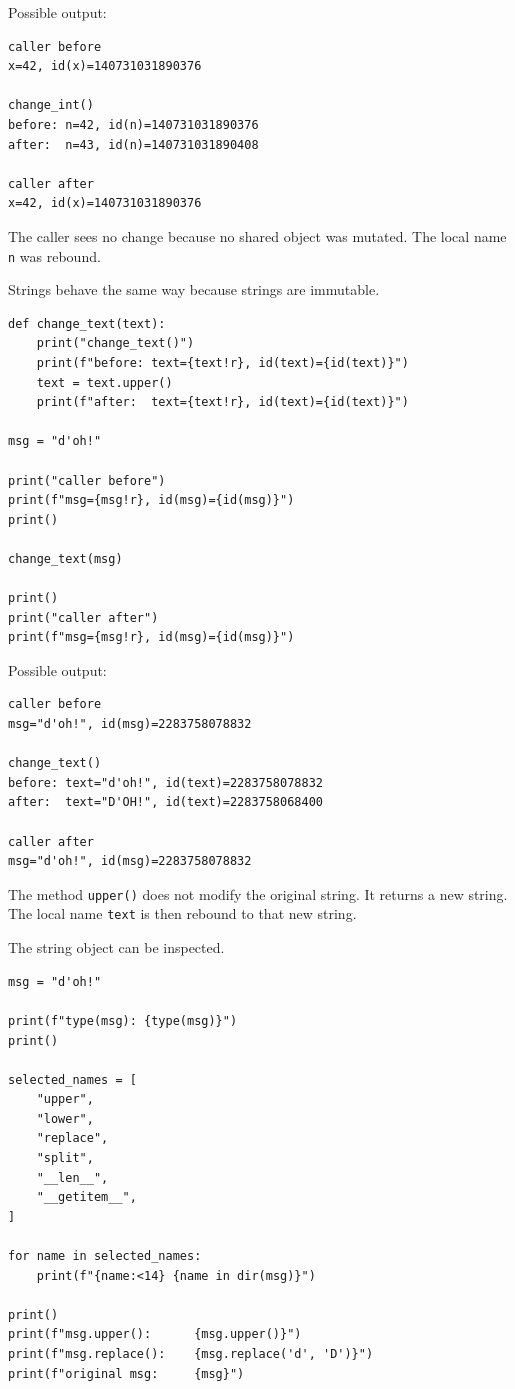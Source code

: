 Possible output:

\begin{verbatim}
caller before
x=42, id(x)=140731031890376

change_int()
before: n=42, id(n)=140731031890376
after:  n=43, id(n)=140731031890408

caller after
x=42, id(x)=140731031890376
\end{verbatim}

The caller sees no change because no shared object was mutated. The local name \texttt{n} was rebound.

Strings behave the same way because strings are immutable.

\begin{verbatim}
def change_text(text):
    print("change_text()")
    print(f"before: text={text!r}, id(text)={id(text)}")
    text = text.upper()
    print(f"after:  text={text!r}, id(text)={id(text)}")

msg = "d'oh!"

print("caller before")
print(f"msg={msg!r}, id(msg)={id(msg)}")
print()

change_text(msg)

print()
print("caller after")
print(f"msg={msg!r}, id(msg)={id(msg)}")
\end{verbatim}

Possible output:

\begin{verbatim}
caller before
msg="d'oh!", id(msg)=2283758078832

change_text()
before: text="d'oh!", id(text)=2283758078832
after:  text="D'OH!", id(text)=2283758068400

caller after
msg="d'oh!", id(msg)=2283758078832
\end{verbatim}

The method \texttt{upper()} does not modify the original string. It returns a new string. The local name \texttt{text} is then rebound to that new string.

The string object can be inspected.

\begin{verbatim}
msg = "d'oh!"

print(f"type(msg): {type(msg)}")
print()

selected_names = [
    "upper",
    "lower",
    "replace",
    "split",
    "__len__",
    "__getitem__",
]

for name in selected_names:
    print(f"{name:<14} {name in dir(msg)}")

print()
print(f"msg.upper():      {msg.upper()}")
print(f"msg.replace():    {msg.replace('d', 'D')}")
print(f"original msg:     {msg}")
\end{verbatim}

